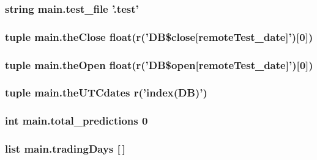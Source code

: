 \hypertarget{namespacemain_ab2ce12225f499c96566bee050694f576}{
\subsubsection[{test\-\_\-file}]{\setlength{\rightskip}{0pt plus 5cm}string main.\-test\-\_\-file '.test'}}\label{namespacemain_ab2ce12225f499c96566bee050694f576}
\hypertarget{namespacemain_a7b7f8e1866fa939903d669eda1f85843}{
\subsubsection[{the\-Close}]{\setlength{\rightskip}{0pt plus 5cm}tuple main.\-the\-Close float(r('D\-B\$close\mbox{[}remote\-Test\-\_\-date\mbox{]}')\mbox{[}0\mbox{]})}}\label{namespacemain_a7b7f8e1866fa939903d669eda1f85843}
\hypertarget{namespacemain_a5ddde740f03e7759f7635b84f49c0cde}{
\subsubsection[{the\-Open}]{\setlength{\rightskip}{0pt plus 5cm}tuple main.\-the\-Open float(r('D\-B\$open\mbox{[}remote\-Test\-\_\-date\mbox{]}')\mbox{[}0\mbox{]})}}\label{namespacemain_a5ddde740f03e7759f7635b84f49c0cde}
\hypertarget{namespacemain_af268f93db929575de02efc78bdbcb8dd}{
\subsubsection[{the\-U\-T\-Cdates}]{\setlength{\rightskip}{0pt plus 5cm}tuple main.\-the\-U\-T\-Cdates r('index(D\-B)')}}\label{namespacemain_af268f93db929575de02efc78bdbcb8dd}
\hypertarget{namespacemain_a0796e61e25078d7fc619d17d9ef2016f}{
\subsubsection[{total\-\_\-predictions}]{\setlength{\rightskip}{0pt plus 5cm}int main.\-total\-\_\-predictions 0}}\label{namespacemain_a0796e61e25078d7fc619d17d9ef2016f}
\hypertarget{namespacemain_a2858a9cb8d47c2fac000edfd9eb5441f}{
\subsubsection[{trading\-Days}]{\setlength{\rightskip}{0pt plus 5cm}list main.\-trading\-Days \mbox{[}$\,$\mbox{]}}}\label{namespacemain_a2858a9cb8d47c2fac000edfd9eb5441f}
